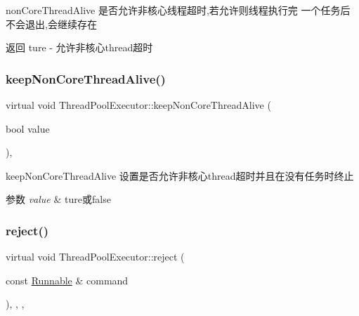 non\+Core\+Thread\+Alive 是否允许非核心线程超时,若允许则线程执行完 一个任务后不会退出,会继续存在 

\begin{DoxyReturn}{返回}
ture -\/ 允许非核心thread超时 
\end{DoxyReturn}
\mbox{\label{classThreadPoolExecutor_a7e6ed2d088147377d1e82018ac3dac1d}} 
\subsubsection{\texorpdfstring{keep\+Non\+Core\+Thread\+Alive()}{keepNonCoreThreadAlive()}\hspace{0.1cm}{\footnotesize\ttfamily [2/2]}}
{\footnotesize\ttfamily virtual void Thread\+Pool\+Executor\+::keep\+Non\+Core\+Thread\+Alive (\begin{DoxyParamCaption}\item[{bool}]{value }\end{DoxyParamCaption})\hspace{0.3cm}{\ttfamily [final]}, {\ttfamily [virtual]}}



keep\+Non\+Core\+Thread\+Alive 设置是否允许非核心thread超时并且在没有任务时终止 


\begin{DoxyParams}{参数}
{\em value} & ture或false \\
\hline
\end{DoxyParams}
\mbox{\label{classThreadPoolExecutor_a14c4e3d786dcf22e858b11a95d2f77ef}} 
\subsubsection{\texorpdfstring{reject()}{reject()}\hspace{0.1cm}{\footnotesize\ttfamily [1/2]}}
{\footnotesize\ttfamily virtual void Thread\+Pool\+Executor\+::reject (\begin{DoxyParamCaption}\item[{const \hyperlink{classRunnable}{Runnable} \&}]{command }\end{DoxyParamCaption})\hspace{0.3cm}{\ttfamily [inline]}, {\ttfamily [final]}, {\ttfamily [protected]}, {\ttfamily [virtual]}}



